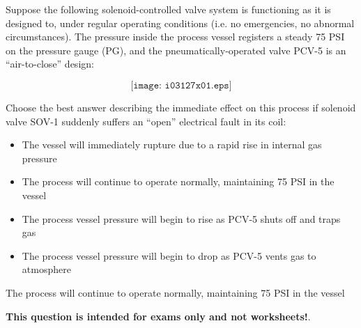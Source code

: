 

Suppose the following solenoid-controlled valve system is functioning as it is designed to, under regular operating conditions (i.e. no emergencies, no abnormal circumstances).  The pressure inside the process vessel registers a steady 75 PSI on the pressure gauge (PG), and the pneumatically-operated valve PCV-5 is an ``air-to-close'' design:

$$\texttt{[image: i03127x01.eps]}$$

\noindent
Choose the best answer describing the immediate effect on this process if solenoid valve SOV-1 suddenly suffers an ``open'' electrical fault in its coil:

\begin{itemize}
\item{} The vessel will immediately rupture due to a rapid rise in internal gas pressure
\vskip 10pt
\item{} The process will continue to operate normally, maintaining 75 PSI in the vessel
\vskip 10pt
\item{} The process vessel pressure will begin to rise as PCV-5 shuts off and traps gas
\vskip 10pt
\item{} The process vessel pressure will begin to drop as PCV-5 vents gas to atmosphere
\end{itemize}







The process will continue to operate normally, maintaining 75 PSI in the vessel







{\bf This question is intended for exams only and not worksheets!}.




